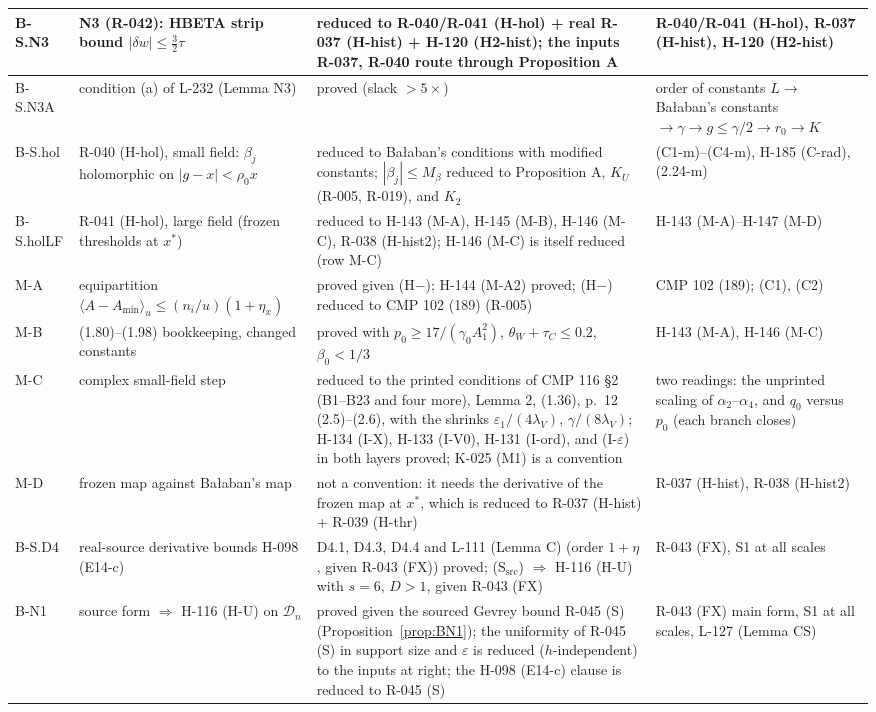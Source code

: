\begin{longtable}{|p{1.3cm}|p{3.3cm}|p{6.2cm}|p{3.6cm}|}
B-S.N3 & N3 (R-042): HBETA strip bound $|\delta w|\le\tfrac32\tau$ & reduced to R-040/R-041 (H-hol) + real R-037 (H-hist) + H-120 (H2-hist); the inputs R-037, R-040 route through Proposition A & R-040/R-041 (H-hol), R-037 (H-hist), H-120 (H2-hist) \\ \hline
B-S.N3A & condition (a) of L-232 (Lemma N3) & proved (slack $>5\times$) & order of constants $L\to$ Ba{\l}aban's constants $\to\gamma\to g\le\gamma/2\to r_0\to K$ \\ \hline
B-S.hol & R-040 (H-hol), small field: $\beta_j$ holomorphic on $|g-x|<\rho_0x$ & reduced to Ba{\l}aban's conditions with modified constants; $|\beta_j|\le M_\beta$ reduced to Proposition A, $K_U$ (R-005, R-019), and $K_2$ & (C1-m)--(C4-m), H-185 (C-rad), (2.24-m) \\ \hline
B-S.holLF & R-041 (H-hol), large field (frozen thresholds at $x^*$) & reduced to H-143 (M-A), H-145 (M-B), H-146 (M-C), R-038 (H-hist2); H-146 (M-C) is itself reduced (row M-C) & H-143 (M-A)--H-147 (M-D) \\ \hline
M-A & equipartition $\langle A-A_{\min}\rangle_u\le(n_i/u)(1+\eta_x)$ & proved given (H$-$); H-144 (M-A2) proved; (H$-$) reduced to CMP 102 (189) (R-005) & CMP 102 (189); (C1), (C2) \\ \hline
M-B & (1.80)--(1.98) bookkeeping, changed constants & proved with $p_0\ge17/(\gamma_0A_1^2)$, $\theta_W+\tau_C\le0.2$, $\beta_0<1/3$ & H-143 (M-A), H-146 (M-C) \\ \hline
M-C & complex small-field step & reduced to the printed conditions of CMP 116 \S2 (B1--B23 and four more), Lemma 2, (1.36), p.\ 12 (2.5)--(2.6), with the shrinks $\varepsilon_1/(4\lambda_V)$, $\gamma/(8\lambda_V)$; H-134 (I-X), H-133 (I-V0), H-131 (I-ord), and (I-$\varepsilon$) in both layers proved; K-025 (M1) is a convention & two readings: the unprinted scaling of $\alpha_2$--$\alpha_4$, and $q_0$ versus $p_0$ (each branch closes) \\ \hline
M-D & frozen map against Ba{\l}aban's map & not a convention: it needs the derivative of the frozen map at $x^*$, which is reduced to R-037 (H-hist) + R-039 (H-thr) & R-037 (H-hist), R-038 (H-hist2) \\ \hline
B-S.D4 & real-source derivative bounds H-098 (E14-c) & D4.1, D4.3, D4.4 and L-111 (Lemma C) (order $1+\eta$, given R-043 (FX)) proved; (S$_{\mathrm{src}}$) $\Rightarrow$ H-116 (H-U) with $s=6$, $D>1$, given R-043 (FX) & R-043 (FX), S1 at all scales \\ \hline
B-N1 & source form $\Rightarrow$ H-116 (H-U) on $\mathcal D_n$ & proved given the sourced Gevrey bound R-045 (S) (Proposition~\ref{prop:BN1}); the uniformity of R-045 (S) in support size and $\varepsilon$ is reduced ($h$-independent) to the inputs at right; the H-098 (E14-c) clause is reduced to R-045 (S) & R-043 (FX) main form, S1 at all scales, L-127 (Lemma CS) \\ \hline

\end{longtable}
